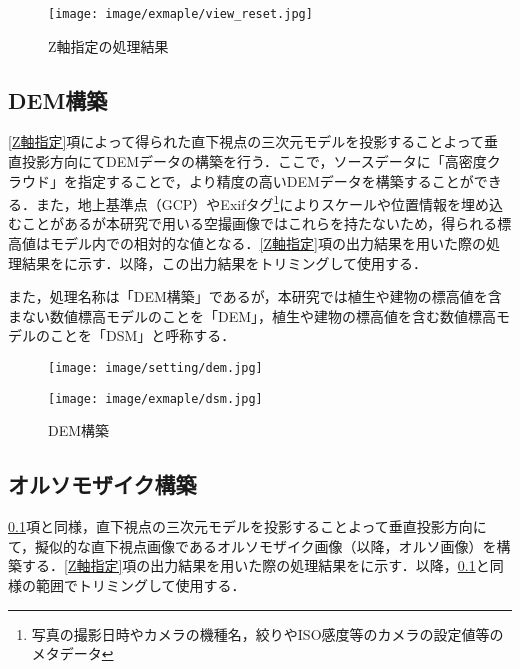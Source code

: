       \begin{figure}[t]
        \centering
        \texttt{[image: image/exmaple/view\_reset.jpg]}
        \caption{Z軸指定の処理結果}
        \label{Z軸指定結果}
      \end{figure}


    \subsection{DEM構築}
      \label{DEM構築}
      \ref{Z軸指定}項によって得られた直下視点の三次元モデルを投影することよって垂直投影方向にてDEMデータの構築を行う．ここで，ソースデータに「高密度クラウド」を指定することで，より精度の高いDEMデータを構築することができる．また，地上基準点（GCP）やExifタグ\footnote{写真の撮影日時やカメラの機種名，絞りやISO感度等のカメラの設定値等のメタデータ}によりスケールや位置情報を埋め込むことがあるが本研究で用いる空撮画像ではこれらを持たないため，得られる標高値はモデル内での相対的な値となる．\ref{Z軸指定}項の出力結果を用いた際の処理結果をに示す．以降，この出力結果をトリミングして使用する．

      また，処理名称は「DEM構築」であるが，本研究では植生や建物の標高値を含まない数値標高モデルのことを「DEM」，植生や建物の標高値を含む数値標高モデルのことを「DSM」と呼称する．

      \begin{figure}[t]
        \begin{minipage}[c]{0.45\hsize}
          \centering
          \texttt{[image: image/setting/dem.jpg]}
        \end{minipage}
        \begin{minipage}[c]{0.45\hsize}
          \centering
          \texttt{[image: image/exmaple/dsm.jpg]}
        \end{minipage}
        \caption{DEM構築}
        \label{DEM構築結果}
      \end{figure}


    \subsection{オルソモザイク構築}
      \label{オルソモザイク構築}
      \ref{DEM構築}項と同様，直下視点の三次元モデルを投影することよって垂直投影方向にて，擬似的な直下視点画像であるオルソモザイク画像（以降，オルソ画像）を構築する．\ref{Z軸指定}項の出力結果を用いた際の処理結果をに示す．以降，\ref{DEM構築}と同様の範囲でトリミングして使用する．

